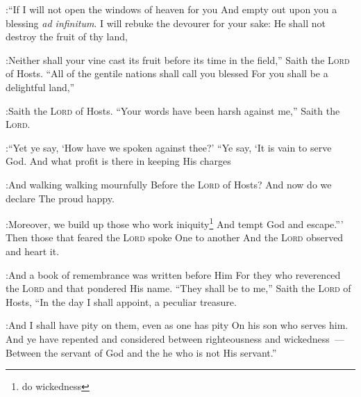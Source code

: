 \begin{enumerate*}[mode=unboxed]
:``If I will not open the windows of heaven for you And empty out upon you a blessing \textit{ad infinitum}.%
     I will rebuke the devourer for your sake: He shall not destroy the fruit of thy land,%

:Neither shall your vine cast its fruit before its time in the field,'' Saith the \textsc{Lord} of Hosts.%
     ``All of the gentile nations shall call you blessed For you shall be a delightful land,''%

:Saith the \textsc{Lord} of Hosts.%
     ``Your words have been harsh against me,'' Saith the \textsc{Lord}.%

:``Yet ye say, `How have we spoken against thee?'%
     ``Ye say, `It is vain to serve God. And what profit is there in keeping His charges%

:And walking walking mournfully Before the \textsc{Lord} of Hosts?%
     And now do we declare The proud happy.%

:Moreover, we build up those who work iniquity\footnote{do wickedness} And tempt God and escape.'''%
     Then those that feared the \textsc{Lord} spoke One to another And the \textsc{Lord} observed and heart it.%

:And a book of remembrance was written before Him For they who reverenced the \textsc{Lord} and that pondered His name.%
     ``They shall be to me,'' Saith the \textsc{Lord} of Hosts, ``In the day I shall appoint, a peculiar treasure.%

:And I shall have pity on them, even as one has pity On his son who serves him.%
     And ye have repented and considered between righteousness and wickedness~--- Between the servant of God and the he who is not His servant.''%
\end{enumerate*}
